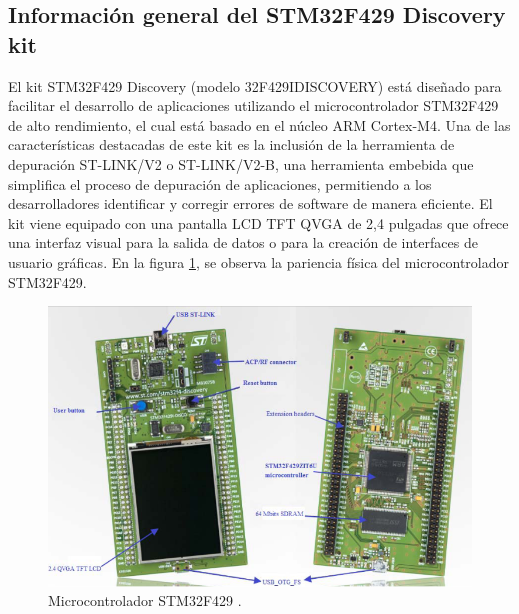 

\subsection{Información general del STM32F429 Discovery kit}

El kit STM32F429 Discovery (modelo 32F429IDISCOVERY) está diseñado para facilitar el desarrollo de aplicaciones utilizando el microcontrolador STM32F429 de alto rendimiento, el cual está basado en el núcleo ARM Cortex-M4. Una de las características destacadas de este kit es la inclusión de la herramienta de depuración ST-LINK/V2 o ST-LINK/V2-B, una herramienta embebida que simplifica el proceso de depuración de aplicaciones, permitiendo a los desarrolladores identificar y corregir errores de software de manera eficiente. El kit viene equipado con una pantalla LCD TFT QVGA de 2,4 pulgadas que ofrece una interfaz visual para la salida de datos o para la creación de interfaces de usuario gráficas. En la figura \ref{STM}, se observa la pariencia física del microcontrolador STM32F429.

 \begin{figure}[H]
        \centering
        \includegraphics[width=1\linewidth]{fotos/STM.png}
        \caption{Microcontrolador STM32F429 \cite{STM}.}
        \label{STM}
    \end{figure}

